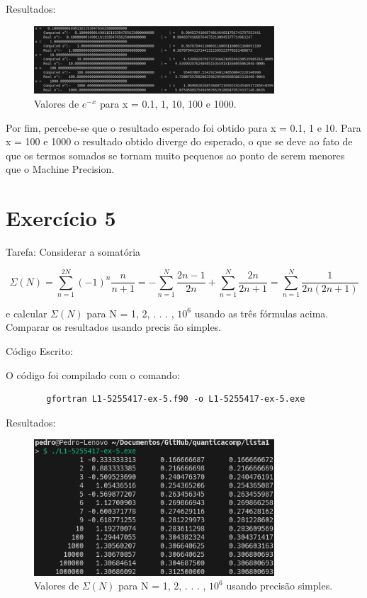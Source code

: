 \documentclass[12pt, a4paper]{article} %
\begin{document}
    Resultados:
    \begin{figure}[H]
        \centering
        \includegraphics[width=0.8\textwidth]{../images/results-ex4.png}
        \caption{Valores de $e^{-x}$ para x = 0.1, 1, 10, 100 e 1000.}
    \end{figure}

    Por fim, percebe-se que o resultado esperado foi obtido para x = 0.1, 1 e 10. Para x = 100 e 1000 o resultado obtido diverge do esperado, o que se deve ao fato de que os termos somados se tornam muito pequenos ao ponto de serem menores que o Machine Precision.

\section{Exerc\'icio 5}

    Tarefa: Considerar a somat\'oria

    \begin{equation} \Sigma (N) = \sum_{n=1}^{2N} (-1)^n\frac{n}{n+1} = - \sum_{n=1}^N \frac{2n-1}{2n} + \sum_{n=1}^N \frac{2n}{2n+1} = \sum_{n=1}^N \frac{1}{2n(2n+1)} \end{equation}

    e calcular $\Sigma (N)$ para N = 1, 2, . . . , $10^6$ usando as tr\^es f\'ormulas acima. Comparar os resultados usando precis \~ao simples.

    C\'odigo Escrito:
    

    O c\'odigo foi compilado com o comando:
    \begin{verbatim}
        gfortran L1-5255417-ex-5.f90 -o L1-5255417-ex-5.exe
    \end{verbatim}

    Resultados:
    \begin{figure}[H]
        \centering
        \includegraphics[width=0.8\textwidth]{../images/results-ex5.png}
        \caption{Valores de $\Sigma (N)$ para N = 1, 2, . . . , $10^6$ usando precis\~ao simples.}
    \end{figure}
\end{document}
